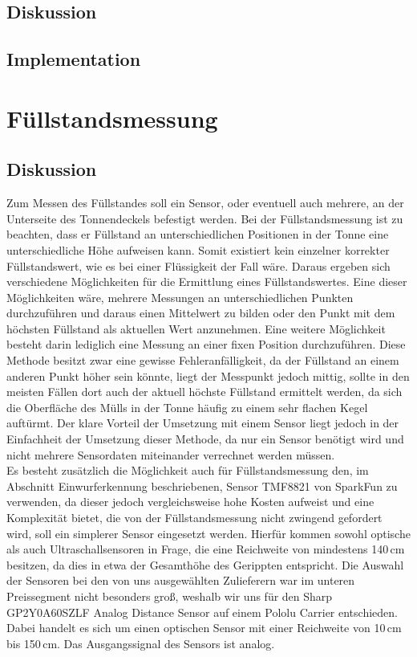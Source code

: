     \subsection{Diskussion}

    \subsection{Implementation}

\section{Füllstandsmessung}
    \subsection{Diskussion}
        Zum Messen des Füllstandes soll ein Sensor, oder eventuell auch mehrere, an der Unterseite des Tonnendeckels befestigt werden. Bei der Füllstandsmessung ist zu beachten, dass er Füllstand an unterschiedlichen Positionen in der Tonne eine unterschiedliche Höhe aufweisen kann. Somit existiert kein einzelner korrekter Füllstandswert, wie es bei einer Flüssigkeit der Fall wäre. Daraus ergeben sich verschiedene Möglichkeiten für die Ermittlung eines Füllstandswertes. Eine dieser Möglichkeiten wäre, mehrere Messungen an unterschiedlichen Punkten durchzuführen und daraus einen Mittelwert zu bilden oder den Punkt mit dem höchsten Füllstand als aktuellen Wert anzunehmen. Eine weitere Möglichkeit besteht darin lediglich eine Messung an einer fixen Position durchzuführen. Diese Methode besitzt zwar eine gewisse Fehleranfälligkeit, da der Füllstand an einem anderen Punkt höher sein könnte, liegt der Messpunkt jedoch mittig, sollte in den meisten Fällen dort auch der aktuell höchste Füllstand ermittelt werden, da sich die Oberfläche des Mülls in der Tonne häufig zu einem sehr flachen Kegel auftürmt. Der klare Vorteil der Umsetzung mit einem Sensor liegt jedoch in der Einfachheit der Umsetzung dieser Methode, da nur ein Sensor benötigt wird und nicht mehrere Sensordaten miteinander verrechnet werden müssen.\\
        
        Es besteht zusätzlich die Möglichkeit auch für Füllstandsmessung den, im Abschnitt Einwurferkennung beschriebenen, Sensor TMF8821 von SparkFun zu verwenden, da dieser jedoch vergleichsweise hohe Kosten aufweist und eine Komplexität bietet, die von der Füllstandsmessung nicht zwingend gefordert wird, soll ein simplerer Sensor eingesetzt werden. Hierfür kommen sowohl optische als auch Ultraschallsensoren in Frage, die eine Reichweite von mindestens 140\,cm besitzen, da dies in etwa der Gesamthöhe des Gerippten entspricht. Die Auswahl der Sensoren bei den von uns ausgewählten Zulieferern war im unteren Preissegment nicht besonders groß, weshalb wir uns für den Sharp GP2Y0A60SZLF Analog Distance Sensor auf einem Pololu Carrier entschieden. Dabei handelt es sich um einen optischen Sensor mit einer Reichweite von 10\,cm bis 150\,cm. Das Ausgangssignal des Sensors ist analog.\\

